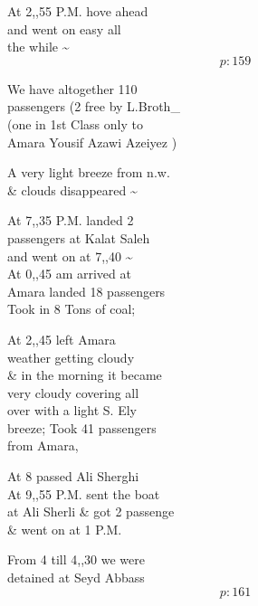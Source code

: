 \documentclass{report}
\begin{document}
	\par{
 	At 2,,55 P.M. hove ahead\ \\and went on easy all\ \\the while \~{}\ \\
  \[p: 159 \]

	}



	\par{
 	We have altogether 110\ \\passengers (2 free by L.Broth\_\ \\(one in 1st Class only to\ \\Amara Yousif Azawi Azeiyez )\ \\
	}

	\par{
 	A very light breeze from n.w.\ \\\& clouds disappeared \~{}\ \\
	}

	\par{
 	At 7,,35 P.M. landed 2\ \\passengers at Kalat Saleh\ \\and went on at 7,,40 \~{}\ \\At 0,,45 am arrived at\ \\Amara landed 18 passengers\ \\Took in 8 Tons of coal;\ \\
	}

	\par{
 	At 2,,45 left Amara\ \\weather getting cloudy\ \\\& in the morning it became\ \\very cloudy covering all\ \\over with a light S. Ely\ \\breeze; Took 41 passengers\ \\from Amara,\ \\
	}

	\par{
 	At 8 passed Ali Sherghi\ \\At 9,,55 P.M. sent the boat\ \\at Ali Sherli \& got 2 passenge\ \\\& went on at 1 P.M.\ \\
	}

	\par{
 	From 4 till 4,,30 we were\ \\detained at Seyd Abbass\ \\
  \[p: 161 \]

	}
\end{document}
